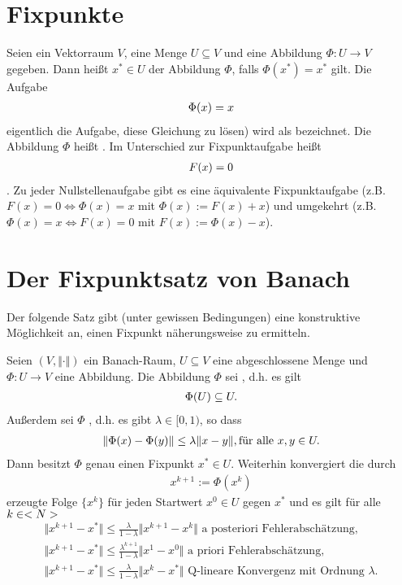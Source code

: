 \section{Fixpunkte}

Seien ein Vektorraum $V$, eine Menge $U \subseteq V$ und eine Abbildung $\Phi: U \to V$ gegeben.
Dann heißt $x^{*} \in U$  der Abbildung $\Phi$, falls $\Phi(x^{*}) = x^{*}$ gilt.
Die Aufgabe
\begin{align}
	\Phi(x) = x\notag
\end{align}
eigentlich die Aufgabe, diese Gleichung zu lösen) wird als  bezeichnet.
Die Abbildung $\Phi$ heißt . Im Unterschied zur Fixpunktaufgabe heißt
\begin{align}
	F(x) = 0 \notag
\end{align}
. 
Zu jeder Nullstellenaufgabe gibt es eine äquivalente Fixpunktaufgabe (z.B. $F(x) = 0 \Leftrightarrow \Phi(x) = x $ mit $\Phi(x) := F(x) + x$) und umgekehrt (z.B.
$\Phi(x) = x \Leftrightarrow F(x) = 0$ mit $F(x) := \Phi(x) -x$).

\section{Der Fixpunktsatz von Banach}

Der folgende Satz gibt (unter gewissen Bedingungen) eine konstruktive Möglichkeit an, einen Fixpunkt näherungsweise zu ermitteln.

\begin{proposition}[Banach]
	Seien $(V, \Vert \cdot \Vert)$ ein Banach-Raum, $U \subseteq V$ eine abgeschlossene Menge und $\Phi: U \to V$ eine Abbildung. Die Abbildung $\Phi$ sei , d.h. es gilt
	\begin{align}
		\Phi(U) \subseteq U.\notag
	\end{align}
	Außerdem sei $\Phi$ , d.h. es gibt $\lambda \in [0,1)$, so dass
	\begin{align}
		\Vert\Phi(x) - \Phi(y)\Vert \le \lambda \Vert x-y\Vert, \text{für alle } x,y \in U.\notag
	\end{align}
	Dann besitzt $\Phi$ genau einen Fixpunkt $x^{*} \in U$. Weiterhin konvergiert die durch
	\begin{align}
		x^{k+1} := \Phi(x^k) \label{eq_1_1_1}
	\end{align}
	erzeugte Folge $\{x^k\}$ für jeden Startwert $x^0 \in U$ gegen $x^{*}$ und es gilt für alle $k \in <N>$
	\begin{align}
		\Vert x^{k+1} - x^{*}\Vert \le \frac{\lambda}{1 - \lambda}\Vert x^{k+1} - x^k\Vert \text{ a posteriori Fehlerabschätzung},\\
		\Vert x^{k+1} - x^{*}\Vert \le \frac{\lambda^{k+1}}{1 - \lambda}\Vert x^1 - x^0\Vert \text{ a priori Fehlerabschätzung},\\
		\Vert x^{k+1} - x^{*}\Vert \le \frac{\lambda}{1 - \lambda}\Vert x^{k} - x^{*}\Vert \text{ Q-lineare Konvergenz mit Ordnung }\lambda.
	\end{align}
\end{proposition}


